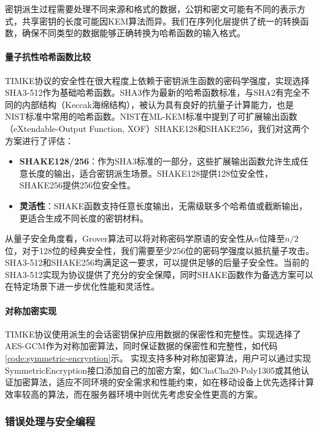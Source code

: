密钥派生过程需要处理不同来源和格式的数据，公钥和密文可能有不同的表示方式，共享密钥的长度可能因KEM算法而异。我们在序列化层提供了统一的转换函数，确保不同类型的数据能够正确转换为哈希函数的输入格式。

\paragraph{量子抗性哈希函数比较}
TIMKE协议的安全性在很大程度上依赖于密钥派生函数的密码学强度，实现选择SHA3-512作为基础哈希函数。SHA3作为最新的哈希函数标准，与SHA2有完全不同的内部结构（Keccak海绵结构），被认为具有良好的抗量子计算能力，也是NIST标准中常用的哈希函数。NIST在ML-KEM标准\cite{nist_mlkem_2024}中提到了可扩展输出函数（eXtendable-Output Function, XOF）SHAKE128和SHAKE256，我们对这两个方案进行了评估：

\begin{itemize}
    \item \textbf{SHAKE128/256}：作为SHA3标准的一部分，这些扩展输出函数允许生成任意长度的输出，适合密钥派生场景。SHAKE128提供128位安全性，SHAKE256提供256位安全性。
    
    \item \textbf{灵活性}：SHAKE函数支持任意长度输出，无需级联多个哈希值或截断输出，更适合生成不同长度的密钥材料。
\end{itemize}

从量子安全角度看，Grover算法可以将对称密码学原语的安全性从$n$位降至$n/2$位，对于128位的经典安全性，我们需要至少256位的密码学强度以抵抗量子攻击。SHA3-512和SHAKE256均满足这一要求，可以提供足够的后量子安全性。当前的SHA3-512实现为协议提供了充分的安全保障，同时SHAKE函数作为备选方案可以在特定场景下进一步优化性能和灵活性。

\paragraph{对称加密实现}
TIMKE协议使用派生的会话密钥保护应用数据的保密性和完整性。实现选择了AES-GCM作为对称加密算法，同时保证数据的保密性和完整性，如代码\ref{code:symmetric-encryption}示。
实现支持多种对称加密算法，用户可以通过实现SymmetricEncryption接口添加自己的加密方案，如ChaCha20-Poly1305或其他认证加密算法，适应不同环境的安全需求和性能约束，如在移动设备上优先选择计算效率较高的算法，而在服务器环境中则优先考虑安全性更高的方案。

\subsubsection{错误处理与安全编程}
\label{subsubsec:error_handling}

